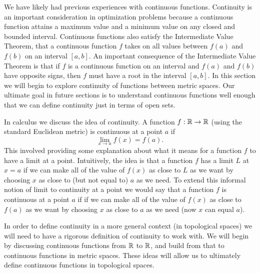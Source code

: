 \label{sec:continuous_functions}


\vspace*{-17 pt}

\vspace*{13 pt}


We have likely had previous experiences with continuous functions. Continuity is an important consideration in optimization problems because a continuous function attains a maximum value and a minimum value on any closed and bounded interval. Continuous functions also satisfy the Intermediate Value Theorem, that a continuous function $f$ takes on all values between $f(a)$ and $f(b)$ on an interval $[a,b]$. An important consequence of the Intermediate Value Theorem is that if $f$ is a continuous function on an interval and $f(a)$ and $f(b)$ have opposite signs, then $f$ must have a root in the interval $[a,b]$. In this section we will begin to explore continuity of functions between metric spaces. Our ultimate goal in future sections is to understand continuous functions well enough that we can define continuity just in terms of open sets. 

In calculus we discuss the idea of continuity. A function $f:\mathbb{R} \to \mathbb{R}$ (using the standard Euclidean metric) is continuous at a point $a$ if 
\[\lim_{x \to a} f(x) = f(a).\]
This involved providing some explanation about what it means for a function $f$ to have a limit at a point. Intuitively, the idea is that a function $f$ has a limit $L$ at $x=a$ if we can make all of the value of $f(x)$ as close to $L$ as we want by choosing $x$ as close to (but not equal to) $a$ as we need. To extend this informal notion of limit to continuity at a point we would say that a function $f$ is continuous at a point $a$ if if we can make all of the value of $f(x)$ as close to $f(a)$ as we want by choosing $x$ as close to $a$ as we need (now $x$ can equal $a$). 

In order to define continuity in a more general context (in topological spaces) we will need to have a rigorous definition of continuity to work with. We will begin by discussing continuous functions from $\mathbb{R}$ to $\mathbb{R}$, and build from that to continuous functions in metric spaces. These ideas will allow us to ultimately define continuous functions in topological spaces. 

